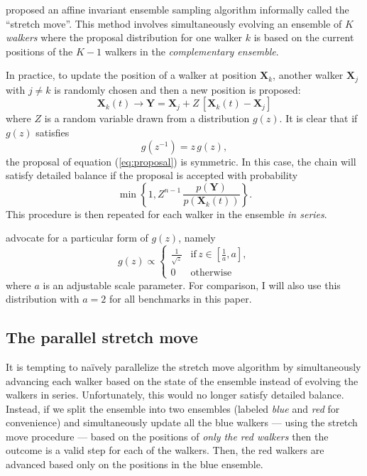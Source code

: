 \documentclass[12pt,preprint]{aastex}
\newcommand{\eq}[1]{equation (\ref{eq:#1})}
\newcommand{\eqlabel}[1]{\label{eq:#1}}
\begin{document}
\citet{Goodman:2010} proposed an affine invariant ensemble sampling algorithm
informally called the ``stretch move''. This method involves simultaneously
evolving an ensemble of $K$ \emph{walkers} where the proposal distribution for one
walker $k$ is based on the current positions of the $K-1$ walkers in the
\emph{complementary ensemble}.

In practice, to update the position of a walker at position $\mathbf{X}_k$,
another walker $\mathbf{X}_j$ with $j \ne k$ is randomly chosen and then
a new position is proposed:
\begin{equation}
    \eqlabel{proposal}
    \mathbf{X}_k (t) \rightarrow \mathbf{Y} = \mathbf{X}_j + Z \, [\mathbf{X}_k (t) - \mathbf{X}_j]
\end{equation}
where $Z$ is a random variable drawn from a distribution $g(z)$.  It is clear that
if $g(z)$ satisfies
\begin{equation}
    g(z^{-1}) = z \, g(z),
\end{equation}
the proposal of \eq{proposal} is symmetric. In this case, the chain will satisfy
detailed balance if the proposal is accepted with probability
\begin{equation}
    \min \left \{ 1, Z^{n-1} \, \frac{p(\mathbf{Y})}{p(\mathbf{X}_k(t))} \right \}.
\end{equation}
This procedure is then repeated for each walker in the ensemble \emph{in series}.

\citet{Goodman:2010} advocate for a particular form of $g(z)$, namely
\begin{equation}
    g(z) \propto \left \{ \begin{array}{ll}
        \displaystyle\frac{1}{\sqrt{z}} & \mathrm{if}\, z\in \left [ \displaystyle\frac{1}{a}, a \right ], \\
        0 & \mathrm{otherwise}
    \end{array} \right .
\end{equation}
where $a$ is an adjustable scale parameter. For comparison, I will also use this
distribution with $a=2$ for all benchmarks in this paper.

\subsection{The parallel stretch move}

It is tempting to na\"ively parallelize the stretch move algorithm by simultaneously
advancing each walker based on the state of the ensemble instead of evolving the
walkers in series. Unfortunately, this would no longer satisfy detailed balance.
Instead, if we split the ensemble into two ensembles (labeled \emph{blue} and
\emph{red} for convenience) and simultaneously update all the blue walkers ---
using the stretch move procedure --- based on the positions of \emph{only the red
walkers} then the outcome is a valid step for each of the walkers. Then,
the red walkers are advanced based only on the positions in the blue ensemble.
\end{document}
